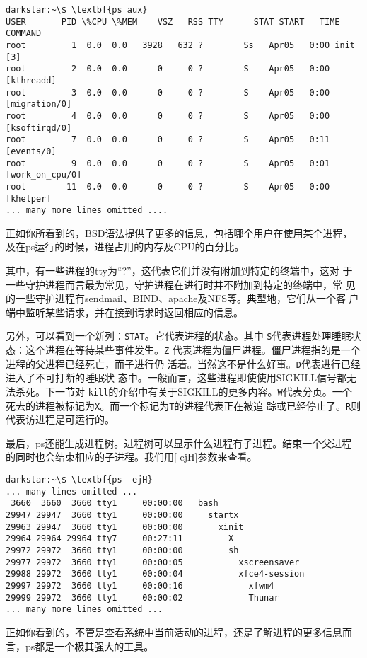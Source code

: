 \begin{Verbatim}[frame=single, commandchars=\\\{\}]
darkstar:~\$ \textbf{ps aux}
USER       PID \%CPU \%MEM    VSZ   RSS TTY      STAT START   TIME COMMAND
root         1  0.0  0.0   3928   632 ?        Ss   Apr05   0:00 init [3]  
root         2  0.0  0.0      0     0 ?        S    Apr05   0:00 [kthreadd]
root         3  0.0  0.0      0     0 ?        S    Apr05   0:00 [migration/0]
root         4  0.0  0.0      0     0 ?        S    Apr05   0:00 [ksoftirqd/0]
root         7  0.0  0.0      0     0 ?        S    Apr05   0:11 [events/0]
root         9  0.0  0.0      0     0 ?        S    Apr05   0:01 [work_on_cpu/0]
root        11  0.0  0.0      0     0 ?        S    Apr05   0:00 [khelper]
... many more lines omitted ....
\end{Verbatim}
正如你所看到的，BSD语法提供了更多的信息，包括哪个用户在使用某个进程，
及在ps运行的时候，进程占用的内存及CPU的百分比。

其中，有一些进程的tty为``?''，这代表它们并没有附加到特定的终端中，这对
于一些守护进程而言最为常见，守护进程在进行时并不附加到特定的终端中，常
见的一些守护进程有sendmail、BIND、apache及NFS等。典型地，它们从一个客
户端中监听某些请求，并在接到请求时返回相应的信息。

另外，可以看到一个新列：\texttt{STAT}。它代表进程的状态。其中
\texttt{S}代表进程处理睡眠状态：这个进程在等待某些事件发生。\texttt{Z}
代表进程为僵尸进程。僵尸进程指的是一个进程的父进程已经死亡，而子进行仍
活着。当然这不是什么好事。\texttt{D}代表进行已经进入了不可打断的睡眠状
态中。一般而言，这些进程即使使用SIGKILL信号都无法杀死。下一节对
\texttt{kill}的介绍中有关于SIGKILL的更多内容。\texttt{W}代表分页。一个
死去的进程被标记为\texttt{X}。而一个标记为\texttt{T}的进程代表正在被追
踪或已经停止了。\texttt{R}则代表访进程是可运行的。

最后，ps还能生成进程树。进程树可以显示什么进程有子进程。结束一个父进程
的同时也会结束相应的子进程。我们用[-ejH]参数来查看。

\begin{Verbatim}[frame=single, commandchars=\\\{\}]
darkstar:~\$ \textbf{ps -ejH}
... many lines omitted ...
 3660  3660  3660 tty1     00:00:00   bash
29947 29947  3660 tty1     00:00:00     startx
29963 29947  3660 tty1     00:00:00       xinit
29964 29964 29964 tty7     00:27:11         X
29972 29972  3660 tty1     00:00:00         sh
29977 29972  3660 tty1     00:00:05           xscreensaver
29988 29972  3660 tty1     00:00:04           xfce4-session
29997 29972  3660 tty1     00:00:16             xfwm4
29999 29972  3660 tty1     00:00:02             Thunar
... many more lines omitted ...
\end{Verbatim}
正如你看到的，不管是查看系统中当前活动的进程，还是了解进程的更多信息而
言，ps都是一个极其强大的工具。


